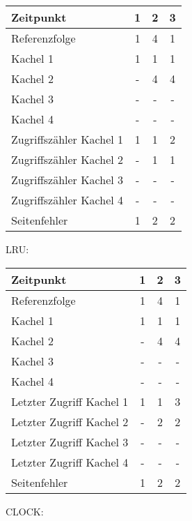 \begin{enumerate}[a)]
\begin{normalText}
\begin{minipage}{.45\textwidth}
		\begin{tabular}{|p{4.3cm}||c|c|c|}
			\hline
			\rowcolor{gray} Zeitpunkt & 1 & 2 & 3 \\
			\hline
			\rowcolor{gray} Referenzfolge & 1 & 4 & 1 \\
			\hline \hline
			Kachel 1 & 1 & 1 & 1 \\
			\hline
			Kachel 2 & - & 4 & 4 \\
			\hline
			Kachel 3 & - & - & - \\
			\hline
			Kachel 4 & - & - & - \\
			\hline \hline
			\rowcolor{lightgray} Zugriffszähler Kachel 1 & 1 & 1 & 2 \\
			\hline
			\rowcolor{lightgray} Zugriffszähler Kachel 2 & - & 1 & 1 \\
			\hline
			\rowcolor{lightgray} Zugriffszähler Kachel 3 & - & - & - \\
			\hline
			\rowcolor{lightgray} Zugriffszähler Kachel 4 & - & - & - \\
			\hline \hline
			\rowcolor{gray} Seitenfehler & 1 & 2 & 2 \\
			\hline
		\end{tabular}
	\end{minipage}

	\begin{minipage}{.49\textwidth}
		LRU:

		\vspace{.25cm}

		\begin{tabular}{|p{4.3cm}||c|c|c|}
			\hline
			\rowcolor{gray} Zeitpunkt & 1 & 2 & 3 \\
			\hline
			\rowcolor{gray} Referenzfolge & 1 & 4 & 1 \\
			\hline \hline
			Kachel 1 & 1 & 1 & 1 \\
			\hline
			Kachel 2 & - & 4 & 4 \\
			\hline
			Kachel 3 & - & - & - \\
			\hline
			Kachel 4 & - & - & - \\
			\hline \hline
			\rowcolor{lightgray} Letzter Zugriff Kachel 1 & 1 & 1 & 3 \\
			\hline
			\rowcolor{lightgray} Letzter Zugriff Kachel 2 & - & 2 & 2 \\
			\hline
			\rowcolor{lightgray} Letzter Zugriff Kachel 3 & - & - & - \\
			\hline
			\rowcolor{lightgray} Letzter Zugriff Kachel 4 & - & - & - \\
			\hline \hline
			\rowcolor{gray} Seitenfehler & 1 & 2 & 2 \\
			\hline
		\end{tabular}
	\end{minipage}
	\begin{minipage}{.45\textwidth}
		CLOCK:


\end{minipage}
\end{normalText}
\end{enumerate}
